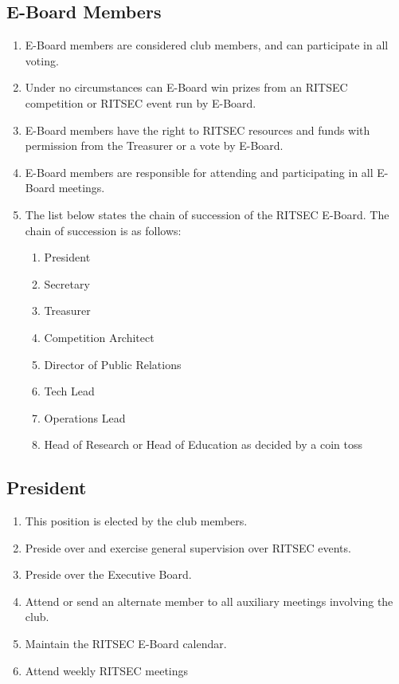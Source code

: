 \documentclass{article}
\begin{document}
\subsection{E-Board Members}

\begin{enumerate}
  \item E-Board members are considered club members, and can participate in all
    voting.
  \item Under no circumstances can E-Board win prizes from an RITSEC
    competition or RITSEC event run by E-Board.
  \item E-Board members have the right to RITSEC resources and funds with
    permission from the Treasurer or a vote by E-Board.
  \item E-Board members are responsible for attending and participating in all
    E-Board meetings.
  \item The list below states the chain of succession of the RITSEC E-Board.
    The chain of succession is as follows:
  \begin{enumerate}
    \item President
    \item Secretary
    \item Treasurer
    \item Competition Architect 
    \item Director of Public Relations
    \item Tech Lead
    \item Operations Lead
    \item Head of Research or Head of Education as decided by a coin toss
  \end{enumerate}
\end{enumerate}

\subsection{President}

\begin{enumerate}
  \item This position is elected by the club members.
  \item Preside over and exercise general supervision over RITSEC events. 
  \item Preside over the Executive Board.
  \item Attend or send an alternate member to all auxiliary meetings involving
    the club.
  \item Maintain the RITSEC E-Board calendar.
  \item Attend weekly RITSEC meetings
\end{enumerate}
\end{document}
